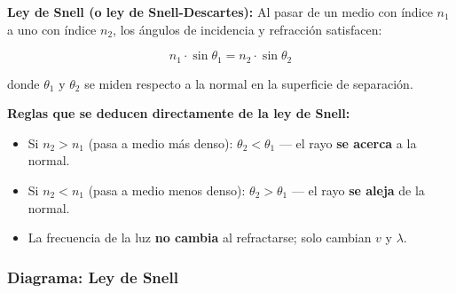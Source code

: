 \begin{seccion}
\begin{definicion}
\textbf{Ley de Snell (o ley de Snell-Descartes):} Al pasar de un medio con índice $n_1$ a uno con índice $n_2$, los ángulos de incidencia y refracción satisfacen:
\end{definicion}

\begin{ecuacion}
$$n_1 \cdot \sin\theta_1 = n_2 \cdot \sin\theta_2$$

donde $\theta_1$ y $\theta_2$ se miden respecto a la normal en la superficie de separación.
\end{ecuacion}

\textbf{Reglas que se deducen directamente de la ley de Snell:}
\begin{itemize}
    \item Si $n_2 > n_1$ (pasa a medio más denso): $\theta_2 < \theta_1$ — el rayo \textbf{se acerca} a la normal.
    \item Si $n_2 < n_1$ (pasa a medio menos denso): $\theta_2 > \theta_1$ — el rayo \textbf{se aleja} de la normal.
    \item La frecuencia de la luz \textbf{no cambia} al refractarse; solo cambian $v$ y $\lambda$.
\end{itemize}
\end{seccion}

\subsubsection{Diagrama: Ley de Snell}

